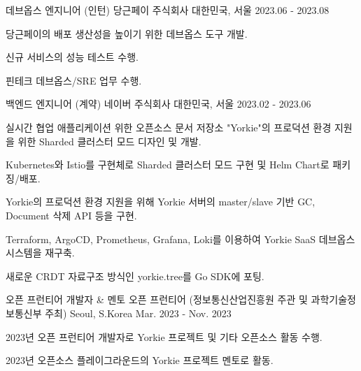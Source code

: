 

\begin{cventries}

  \cventry
    {데브옵스 엔지니어 (인턴)} %
    {당근페이 주식회사} %
    {대한민국, 서울} %
    {2023.06 - 2023.08} %
    {
      \begin{cvitems} %
        \item {당근페이의 배포 생산성을 높이기 위한 데브옵스 도구 개발.}
        \item {신규 서비스의 성능 테스트 수행.}
        \item {핀테크 데브옵스/SRE 업무 수행.}
      \end{cvitems}
    }

  \cventry
    {백엔드 엔지니어 (계약)} %
    {네이버 주식회사} %
    {대한민국, 서울} %
    {2023.02 - 2023.06} %
    {
      \begin{cvitems} %
        \item {실시간 협업 애플리케이션 위한 오픈소스 문서 저장소 "Yorkie"의 프로덕션 환경 지원을 위한 Sharded 클러스터 모드 디자인 및 개발.}
        \item {Kubernetes와 Istio를 구현체로 Sharded 클러스터 모드 구현 및 Helm Chart로 패키징/배포.}
        \item {Yorkie의 프로덕션 환경 지원을 위해 Yorkie 서버의 master/slave 기반 GC, Document 삭제 API 등을 구현.}        
        \item {Terraform, ArgoCD, Prometheus, Grafana, Loki를 이용하여 Yorkie SaaS 데브옵스 시스템을 재구축.}
        \item {새로운 CRDT 자료구조 방식인 yorkie.tree를 Go SDK에 포팅.}
      \end{cvitems}
    }

  \cventry
    {오픈 프런티어 개발자 \& 멘토} %
    {오픈 프런티어 (정보통신산업진흥원 주관 및 과학기술정보통신부 주최)} %
    {Seoul, S.Korea} %
    {Mar. 2023 - Nov. 2023} %
    {
      \begin{cvitems} %
        \item {2023년 오픈 프런티어 개발자로 Yorkie 프로젝트 및 기타 오픈소스 활동 수행.}
        \item {2023년 오픈소스 플레이그라운드의 Yorkie 프로젝트 멘토로 활동.}
      \end{cvitems}
    }


\end{cventries}
